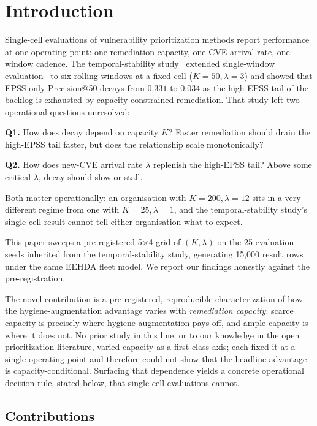 \section{Introduction}

Single-cell evaluations of vulnerability prioritization methods report
performance at one operating point: one remediation capacity, one CVE
arrival rate, one window cadence. The temporal-stability study~\cite{paper5temporal} extended
single-window evaluation~\cite{paper4hygieneprio} to six rolling windows
at a fixed cell ($K = 50, \lambda = 3$) and showed that EPSS-only
Precision@50 decays from $0.331$ to $0.034$ as the high-EPSS tail of
the backlog is exhausted by capacity-constrained remediation. That study
left two operational questions unresolved:

\textbf{Q1.} How does decay depend on capacity $K$? Faster remediation
should drain the high-EPSS tail faster, but does the relationship
scale monotonically?

\textbf{Q2.} How does new-CVE arrival rate $\lambda$ replenish the high-EPSS
tail? Above some critical $\lambda$, decay should slow or stall.

Both matter operationally: an organisation with $K = 200, \lambda = 12$
sits in a very different regime from one with $K = 25, \lambda = 1$, and
the temporal-stability study's single-cell result cannot tell either organisation what to expect.

This paper sweeps a pre-registered 5$\times$4 grid of $(K, \lambda)$
on the 25 evaluation seeds inherited from the temporal-stability study, generating 15{,}000
result rows under the same EEHDA fleet model. We report our
findings honestly against the pre-registration.

The novel contribution is a pre-registered, reproducible
characterization of how the hygiene-augmentation advantage varies with
\emph{remediation capacity}: scarce capacity is precisely where hygiene
augmentation pays off, and ample capacity is where it does not.
No prior study in this line, or to our knowledge in the open
prioritization literature, varied capacity as a first-class axis; each
fixed it at a single operating point and therefore could not show that
the headline advantage is capacity-conditional. Surfacing that
dependence yields a concrete operational decision rule, stated below,
that single-cell evaluations cannot.

\subsection{Contributions}

